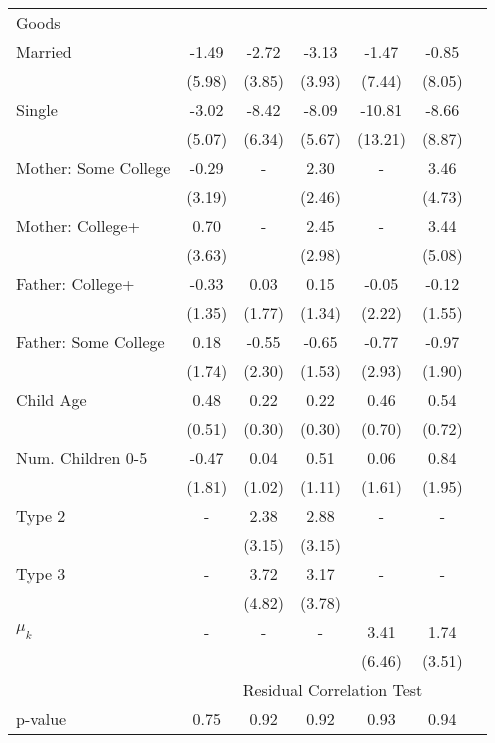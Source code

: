 \begin{tabular}{lcccccc}
Goods}\\\cmidrule(r){2-7}Married&-1.49&-2.72&-3.13&-1.47&-0.85&\\&(5.98)&(3.85)&(3.93)&(7.44)&(8.05)&\\Single&-3.02&-8.42&-8.09&-10.81&-8.66&\\&(5.07)&(6.34)&(5.67)&(13.21)&(8.87)&\\Mother: Some College&-0.29&-&2.30&-&3.46&\\&(3.19)&&(2.46)&&(4.73)&\\Mother: College+&0.70&-&2.45&-&3.44&\\&(3.63)&&(2.98)&&(5.08)&\\Father: College+&-0.33&0.03&0.15&-0.05&-0.12&\\&(1.35)&(1.77)&(1.34)&(2.22)&(1.55)&\\Father: Some College&0.18&-0.55&-0.65&-0.77&-0.97&\\&(1.74)&(2.30)&(1.53)&(2.93)&(1.90)&\\Child Age&0.48&0.22&0.22&0.46&0.54&\\&(0.51)&(0.30)&(0.30)&(0.70)&(0.72)&\\Num. Children 0-5&-0.47&0.04&0.51&0.06&0.84&\\&(1.81)&(1.02)&(1.11)&(1.61)&(1.95)&\\Type 2&-&2.38&2.88&-&-&\\&&(3.15)&(3.15)&&&\\Type 3&-&3.72&3.17&-&-&\\&&(4.82)&(3.78)&&&\\$\mu_{k}$&-&-&-&3.41&1.74&\\&&&&(6.46)&(3.51)&\\& \multicolumn{6}{c}{Residual Correlation Test}\\\cmidrule(r){2-7}p-value&0.75&0.92&0.92&0.93&0.94&\\
\bottomrule\end{tabular}